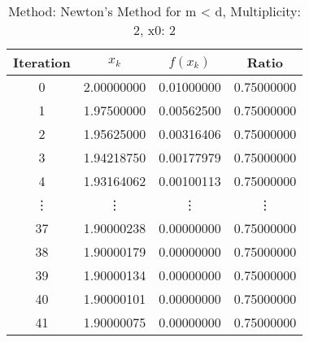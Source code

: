 \begin{table}
\centering
\caption{Method: Newton's Method for m < d, Multiplicity: 2, x0: 2}
\label{tab:table_Newton's_Method_for_m_<_d_2_2}
\begin{tabular}{c c c c}
\toprule
Iteration &      $x_k$ &   $f(x_k)$ &      Ratio \\
\midrule
        0 & 2.00000000 & 0.01000000 & 0.75000000 \\
        1 & 1.97500000 & 0.00562500 & 0.75000000 \\
        2 & 1.95625000 & 0.00316406 & 0.75000000 \\
        3 & 1.94218750 & 0.00177979 & 0.75000000 \\
        4 & 1.93164062 & 0.00100113 & 0.75000000 \\
   \vdots &     \vdots &     \vdots &     \vdots \\
       37 & 1.90000238 & 0.00000000 & 0.75000000 \\
       38 & 1.90000179 & 0.00000000 & 0.75000000 \\
       39 & 1.90000134 & 0.00000000 & 0.75000000 \\
       40 & 1.90000101 & 0.00000000 & 0.75000000 \\
       41 & 1.90000075 & 0.00000000 & 0.75000000 \\
\bottomrule
\end{tabular}
\end{table}
